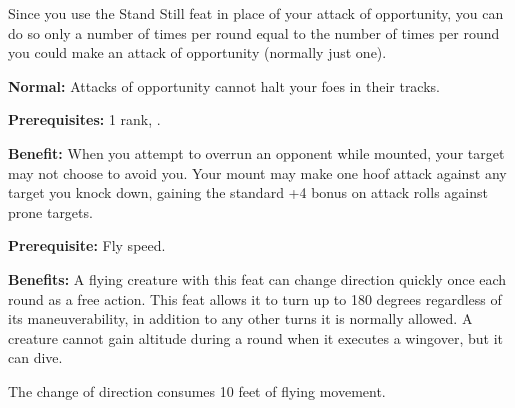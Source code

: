 Since you use the Stand Still feat in place of your attack of opportunity, you can do so only a number of times per round equal to the number of times per round you could make an attack of opportunity (normally just one).

\textbf{Normal:} Attacks of opportunity cannot halt your foes in their tracks.


\textbf{Prerequisites:}  1 rank, .

\textbf{Benefit:} When you attempt to overrun an opponent while mounted, your target may not choose to avoid you. Your mount may make one hoof attack against any target you knock down, gaining the standard +4 bonus on attack rolls against prone targets.


\textbf{Prerequisite:} Fly speed.

\textbf{Benefits:} A flying creature with this feat can change direction quickly once each round as a free action. This feat allows it to turn up to 180 degrees regardless of its maneuverability, in addition to any other turns it is normally allowed. A creature cannot gain altitude during a round when it executes a wingover, but it can dive.

The change of direction consumes 10 feet of flying movement.
